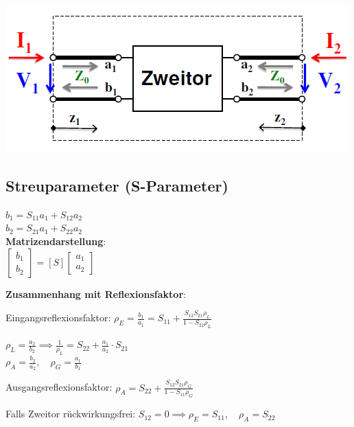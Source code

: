 \documentclass[english]{latex4ei/latex4ei_sheet}
\begin{document}
\begin{sectionbox}
    \includegraphics[width = \columnwidth]{./img/zweitor_amplituden.png}
\end{sectionbox}
\begin{sectionbox}
    \subsection{Streuparameter (S-Parameter)}
    $b_1 = S_{11} a_1 + S_{12} a_2$\\
    $b_2 = S_{21} a_1 + S_{22} a_2$\\
    \textbf{Matrizendarstellung}:\\
    $\begin{bmatrix}
            b_1 \\
            b_2
        \end{bmatrix}
        = [S] \begin{bmatrix}
            a_1 \\
            a_2
        \end{bmatrix}$

    \textbf{Zusammenhang mit Reflexionsfaktor}:\\
    \begin{emphbox}
        Eingangsreflexionsfaktor: $\rho_E = \frac{b_1}{a_1} = S_{11} + \frac{S_{12}S_{21}\rho_L}{1-S_{22}\rho_L}$
    \end{emphbox}

    $\rho_L = \frac{a_2}{b_2}  \implies \frac{1}{\rho_L} = S_{22} + \frac{a_1}{a_2}\cdot S_{21}$\\

    $\rho_A = \frac{b_2}{a_2}, \quad \rho_G = \frac{a_1}{b_1}$\\
    \begin{emphbox}
        Ausgangsreflexionsfaktor: $\rho_A = S_{22} + \frac{S_{12}S_{21}\rho_G}{1-S_{11}\rho_G}$
    \end{emphbox}
    Falls Zweitor rückwirkungsfrei: $S_{12} = 0 \implies \rho_E = S_{11}, \quad \rho_A = S_{22}$\\


\end{sectionbox}
\end{document}
